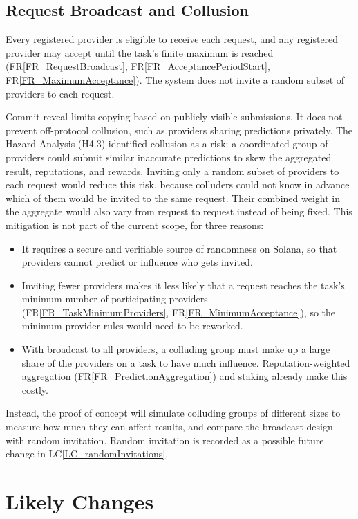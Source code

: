 \documentclass[12pt]{article}
\newcommand{\rref}[1]{FR\ref{#1}}
\newcommand{\lcref}[1]{LC\ref{#1}}
\begin{document}
\subsection{Request Broadcast and Collusion} \label{sec_RationaleBroadcast}

Every registered provider is eligible to receive each request, and any
registered provider may accept until the task's finite maximum is reached
(\rref{FR_RequestBroadcast}, \rref{FR_AcceptancePeriodStart},
\rref{FR_MaximumAcceptance}). The system does not invite a random subset of
providers to each request.

Commit-reveal limits copying based on publicly visible submissions. It does not prevent off-protocol collusion, such as providers sharing predictions privately. The Hazard Analysis (H4.3) identified collusion as a risk: a coordinated group
of providers could submit similar inaccurate predictions to skew the aggregated
result, reputations, and rewards. Inviting only a random subset of providers to
each request would reduce this risk, because colluders could not know in advance
which of them would be invited to the same request. Their combined weight in the
aggregate would also vary from request to request instead of being fixed. This
mitigation is not part of the current scope, for three reasons:

\begin{itemize}
\item It requires a secure and verifiable source of randomness on Solana, so
  that providers cannot predict or influence who gets invited.
\item Inviting fewer providers makes it less likely that a request reaches the
  task's minimum number of participating providers
  (\rref{FR_TaskMinimumProviders}, \rref{FR_MinimumAcceptance}), so the
  minimum-provider rules would need to be reworked.
\item With broadcast to all providers, a colluding group must make up a large
  share of the providers on a task to have much influence. Reputation-weighted
  aggregation (\rref{FR_PredictionAggregation}) and staking already make this
  costly.
\end{itemize}

Instead, the proof of concept will simulate colluding groups of different sizes
to measure how much they can affect results, and compare the broadcast design
with random invitation. Random invitation is recorded as a possible future
change in \lcref{LC_randomInvitations}.

\section{Likely Changes}
\end{document}
